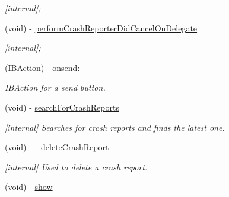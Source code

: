 \begin{DoxyCompactItemize}
\begin{DoxyCompactList}\small\item\em \mbox{[}internal\mbox{]}; \item\end{DoxyCompactList}\item 
\hypertarget{interface_g_d_crash_reporter_acf9393be1beaf9df4c85a4cb066290b9}{
(void) -\/ \hyperlink{interface_g_d_crash_reporter_acf9393be1beaf9df4c85a4cb066290b9}{performCrashReporterDidCancelOnDelegate}}
\label{interface_g_d_crash_reporter_acf9393be1beaf9df4c85a4cb066290b9}

\begin{DoxyCompactList}\small\item\em \mbox{[}internal\mbox{]}; \item\end{DoxyCompactList}\item 
\hypertarget{interface_g_d_crash_reporter_a730c1f3d371f6bdbfa99b61cab0d53e3}{
(IBAction) -\/ \hyperlink{interface_g_d_crash_reporter_a730c1f3d371f6bdbfa99b61cab0d53e3}{onsend:}}
\label{interface_g_d_crash_reporter_a730c1f3d371f6bdbfa99b61cab0d53e3}

\begin{DoxyCompactList}\small\item\em IBAction for a send button. \item\end{DoxyCompactList}\item 
\hypertarget{interface_g_d_crash_reporter_a794c06768e5a4043ce788f772d1f51f1}{
(void) -\/ \hyperlink{interface_g_d_crash_reporter_a794c06768e5a4043ce788f772d1f51f1}{searchForCrashReports}}
\label{interface_g_d_crash_reporter_a794c06768e5a4043ce788f772d1f51f1}

\begin{DoxyCompactList}\small\item\em \mbox{[}internal\mbox{]} Searches for crash reports and finds the latest one. \item\end{DoxyCompactList}\item 
\hypertarget{interface_g_d_crash_reporter_a7503824e3464d1bebbe49b572b41b2b8}{
(void) -\/ \hyperlink{interface_g_d_crash_reporter_a7503824e3464d1bebbe49b572b41b2b8}{\_\-deleteCrashReport}}
\label{interface_g_d_crash_reporter_a7503824e3464d1bebbe49b572b41b2b8}

\begin{DoxyCompactList}\small\item\em \mbox{[}internal\mbox{]} Used to delete a crash report. \item\end{DoxyCompactList}\item 
\hypertarget{interface_g_d_crash_reporter_a0afcd3473af618da01df046cf9a82711}{
(void) -\/ \hyperlink{interface_g_d_crash_reporter_a0afcd3473af618da01df046cf9a82711}{show}}
\label{interface_g_d_crash_reporter_a0afcd3473af618da01df046cf9a82711}


\end{DoxyCompactItemize}
